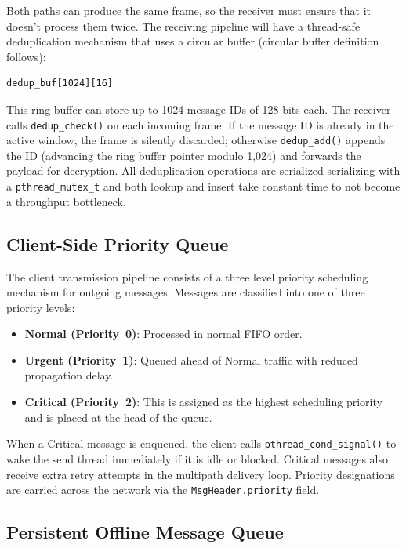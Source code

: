 \documentclass[conference]{IEEEtran}
\begin{document}
Both paths can produce the same frame, so the receiver must ensure that it doesn't process them twice. The receiving pipeline will have a thread-safe deduplication mechanism that uses a circular buffer (circular buffer definition follows):
\begin{verbatim}
dedup_buf[1024][16]
\end{verbatim}
This ring buffer can store up to 1024 message IDs of 128-bits each. The receiver calls \texttt{dedup\_check()} on each incoming frame: If the message ID is already in the active window, the frame is silently discarded; otherwise \texttt{dedup\_add()} appends the ID (advancing the ring buffer pointer modulo 1,024) and forwards the payload for decryption. All deduplication operations are serialized serializing with a \texttt{pthread\_mutex\_t} and both lookup and insert take constant time to not become a throughput bottleneck.

\subsection{Client-Side Priority Queue}

The client transmission pipeline consists of a three level priority scheduling mechanism for outgoing messages. Messages are classified into one of three priority levels:
\begin{itemize}
    \item \textbf{Normal (Priority~0)}: Processed in normal FIFO order.
    \item \textbf{Urgent (Priority~1)}: Queued ahead of Normal traffic with reduced propagation delay.
    \item \textbf{Critical (Priority~2)}: This is assigned as the highest scheduling priority and is placed at the head of the queue.
\end{itemize}
When a Critical message is enqueued, the client calls \texttt{pthread\_cond\_signal()} to wake the send thread immediately if it is idle or blocked. Critical messages also receive extra retry attempts in the multipath delivery loop. Priority designations are carried across the network via the \texttt{MsgHeader.priority} field.

\subsection{Persistent Offline Message Queue}
\end{document}
